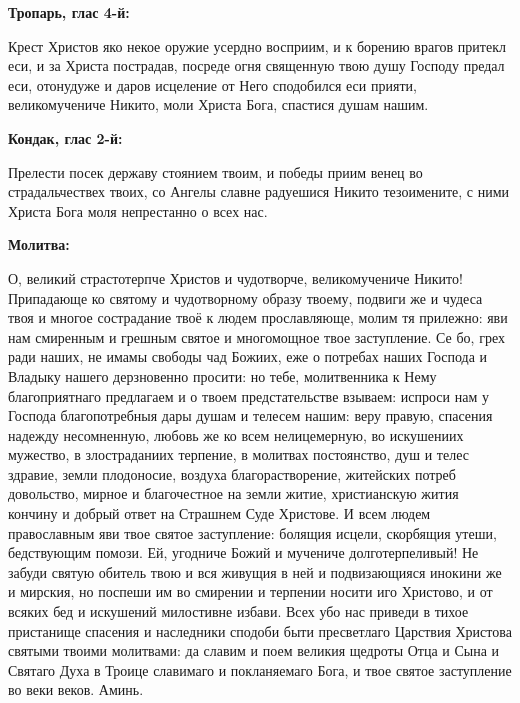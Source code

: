 \bfseries Тропарь, глас 4-й:\normalfont{}


Крест Христов яко некое оружие усердно восприим, и к борению врагов притекл еси, и за Христа пострадав, посреде огня священную твою душу Господу предал еси, отонудуже и даров исцеление от Него сподобился еси прияти, великомучениче Никито, моли Христа Бога, спастися душам нашим.


\medskip
\bfseries Кондак, глас 2-й:\normalfont{}\nopagebreak

Прелести посек державу стоянием твоим, и победы приим венец во страдальчествех твоих, со Ангелы славне радуешися Никито тезоимените, с ними Христа Бога моля непрестанно о всех нас.


\medskip
\bfseries Молитва:\normalfont{}\nopagebreak


О, великий страстотерпче Христов и чудотворче, великомучениче Никито! Припадающе ко святому и чудотворному образу твоему, подвиги же и чудеса твоя и многое сострадание твоё к людем прославляюще, молим тя прилежно: яви нам смиренным и грешным святое и многомощное твое заступление. Се бо, грех ради наших, не имамы свободы чад Божиих, еже о потребах наших Господа и Владыку нашего дерзновенно просити: но тебе, молитвенника к Нему благоприятнаго предлагаем и о твоем предстательстве взываем: испроси нам у Господа благопотребныя дары душам и телесем нашим: веру правую, спасения надежду несомненную, любовь же ко всем нелицемерную, во искушениих мужество, в злостраданиих терпение, в молитвах постоянство, душ и телес здравие, земли плодоносие, воздуха благорастворение, житейских потреб довольство, мирное и благочестное на земли житие, христианскую жития кончину и добрый ответ на Страшнем Суде Христове. И всем людем православным яви твое святое заступление: болящия исцели, скорбящия утеши, бедствующим помози. Ей, угодниче Божий и мучениче долготерпеливый! Не забуди святую обитель твою и вся живущия в ней и подвизающияся инокини же и мирския, но поспеши им во смирении и терпении носити иго Христово, и от всяких бед и искушений милостивне избави. Всех убо нас приведи в тихое пристанище спасения и наследники сподоби быти пресветлаго Царствия Христова святыми твоими молитвами: да славим и поем великия щедроты Отца и Сына и Святаго Духа в Троице славимаго и покланяемаго Бога, и твое святое заступление во веки веков. Аминь. \mychapterending


 

